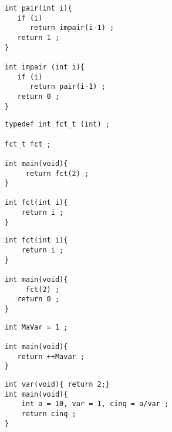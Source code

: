 \begin{frame}[fragile]
\begin{verbatim}
int pair(int i){
   if (i)
      return impair(i-1) ;
   return 1 ;
}

int impair (int i){ 
   if (i)
      return pair(i-1) ;
   return 0 ;
}
\end{verbatim}
\end{frame}
\begin{frame}[fragile]
\begin{verbatim}
typedef int fct_t (int) ;

fct_t fct ;

int main(void){
     return fct(2) ;
}

int fct(int i){
    return i ;
}
\end{verbatim}
\end{frame}
\begin{frame}[fragile]
\begin{verbatim}
int fct(int i){ 
    return i ; 
}

int main(void){
     fct(2) ; 
   return 0 ;
}

\end{verbatim}
\end{frame}
\begin{frame}[fragile]
\begin{verbatim}
int MaVar = 1 ;

int main(void){
   return ++Mavar ;
}
\end{verbatim}
\end{frame}
\begin{frame}[fragile]
\begin{verbatim}
int var(void){ return 2;}
int main(void){ 
    int a = 10, var = 1, cinq = a/var ;
    return cinq ;
}
\end{verbatim}
\end{frame}
